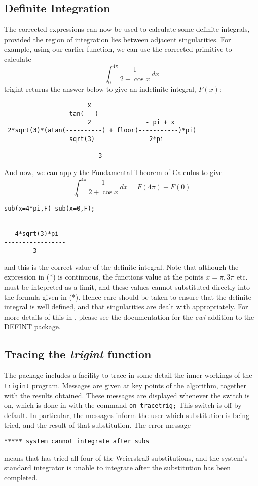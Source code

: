 \subsection{Definite Integration}
The corrected expressions can now be used to calculate some definite integrals, provided the region of integration lies between adjacent singularities. For example, using our earlier function, we can use the corrected primitive to calculate
     \begin{equation} \int_{0}^{4\pi} \frac{1}{2+\cos x}\,dx \end{equation}
trigint returns the answer below to give an indefinite integral, $F(x)$:
\begin{verbatim}
                       x
                  tan(---)
                       2               - pi + x
 2*sqrt(3)*(atan(----------) + floor(-----------)*pi)
                  sqrt(3)               2*pi
------------------------------------------------------
                          3
\end{verbatim}
And now, we can apply the Fundamental Theorem of Calculus to give
 \begin{equation} \int_{0}^{4\pi} \frac{1}{2+\cos x}\,dx = F(4\pi)-F(0) \end{equation}
\begin{verbatim}
sub(x=4*pi,F)-sub(x=0,F);


   4*sqrt(3)*pi
-----------------
        3
\end{verbatim}
and this is the correct value of the definite integral.
Note that although the expression in (*) is continuous, the functions value at the points $x=\pi,3\pi$ etc. must be intepreted as a limit, and these values cannot substituted directly into the formula given in (*). Hence care should be taken to ensure that the definite integral is well defined, and that singularities are dealt with appropriately. For more details of this in \REDUCE, please see the documentation for the \emph{cwi} addition to the \textsc{DEFINT} package.

\subsection{Tracing the \emph{trigint} function}

\hypertarget{switch:TRACETRIG}{}%
The package includes a facility to trace in some detail the inner workings of the \texttt{trigint} program. Messages are given at key points of the algorithm, together with the results obtained. These messages are displayed whenever the switch  is on, which is done in \REDUCE with the
command \texttt{on tracetrig;}
This switch is off by default. In particular, the messages inform the user which substitution is being tried, and the result of that substitution. The error message
\begin{verbatim}
***** system cannot integrate after subs
\end{verbatim}
means that \REDUCE has tried all four of the Weierstra\ss{} substitutions, and the system's standard integrator is unable to integrate after the substitution has been completed.

